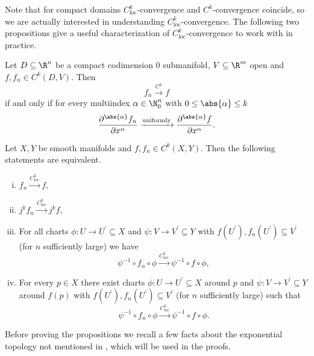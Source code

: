 Note that for compact domains $C^k_{\mathrm{loc}}$-convergence and $C^k$-convergence coincide, so we are actually interested in understanding $C^k_{\mathrm{loc}}$-convergence. The following two propositions give a useful characterization of $C^k_{\mathrm{loc}}$-convergence to work with in practice. 

\begin{proposition}
    \label{whitney_top:prop:ck_conv_on_rn}
    Let $D\subseteq \R^n$ be a compact codimension $0$ submanifold, $V \subseteq \R^m$ open and $f,f_n \in C^k(D,V)$. Then
    \[
    f_n \xrightarrow{C^k} f
    \]
    if and only if for every multiindex $\alpha \in \N^n_0$ with $0\leq\abs{\alpha} \leq k$
    \[
    \frac{\partial^{\abs{\alpha}}f_n}{\partial x^\alpha} \xrightarrow{\mathrm{uniformly}}\frac{\partial^{\abs{\alpha}}f}{\partial x^\alpha}.
    \]
\end{proposition}

\begin{proposition}
    \label{whitney_top:prop:ck_conv_equivalent_characterizations}
    Let $X,Y$ be smooth manifolds and $f,f_n \in C^k(X,Y)$. Then the following statements are equivalent.
    \begin{enumerate}[(i)]
        \item $f_n \xrightarrow{C^k_{\mathrm{loc}}} f$,
        \item $j^kf_n \xrightarrow{C^0_{\mathrm{loc}}} j^kf$,
        \item For all charts $\phi \colon U \to U^\prime \subseteq X$ and $\psi \colon V \to V^\prime \subseteq Y$ with $f(U^\prime), f_n(U^\prime) \subseteq V^\prime$ (for $n$ sufficiently large) we have 
        \[
        \psi^{-1} \circ f_n \circ \phi \xrightarrow{C^k_{\mathrm{loc}}} \psi^{-1} \circ f \circ \phi,
        \]
        \item For every $p \in X$ there exist charts $\phi \colon U \to U^\prime \subseteq X$ around $p$ and $\psi \colon V \to V^\prime \subseteq Y$ around $f(p)$ with $f(U^\prime), f_n(U^\prime) \subseteq V^\prime$ (for $n$ sufficiently large) such that
        \[
        \psi^{-1} \circ f_n \circ \phi \xrightarrow{C^k_{\mathrm{loc}}} \psi^{-1} \circ f \circ \phi.
        \]
    \end{enumerate}
\end{proposition}

Before proving the propositions we recall a few facts about the exponential topology not mentioned in \cite{steimle_topo}, which will be used in the proofs.

